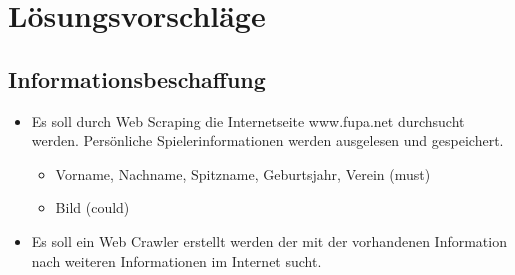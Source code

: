 
\chapter{Lösungsvorschläge}  %
\label{cha:} %
\section{Informationsbeschaffung} %
\begin{itemize}
	\item Es soll durch Web Scraping die Internetseite www.fupa.net durchsucht werden. Persönliche Spielerinformationen werden ausgelesen und gespeichert.
	\begin{itemize}
		\item Vorname, Nachname, Spitzname, Geburtsjahr, Verein (must)
		\item Bild (could)
	\end{itemize}
	\item Es soll ein Web Crawler erstellt werden der mit der vorhandenen Information nach weiteren Informationen im Internet sucht.
\end{itemize}